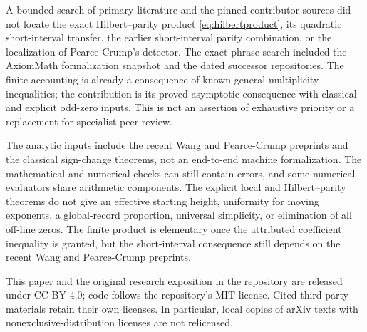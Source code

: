 \documentclass[11pt]{article}
\theoremstyle{remark}
\begin{document}
A bounded search of primary literature and the pinned contributor sources
did not locate the exact Hilbert--parity product \eqref{eq:hilbertproduct},
its quadratic short-interval transfer, the earlier short-interval parity
combination, or the localization of Pearce-Crump's detector. The exact-phrase
search included the AxiomMath formalization snapshot and the dated successor
repositories. The finite accounting is already a consequence
of known general multiplicity inequalities; the contribution is its proved
asymptotic consequence with classical and explicit odd-zero inputs. This is
not an assertion of exhaustive priority or a replacement for specialist peer
review.

The analytic inputs include the recent Wang and Pearce-Crump preprints and
the classical sign-change theorems, not an end-to-end machine formalization.
The mathematical and numerical checks can still contain errors, and some
numerical evaluators share arithmetic components. The explicit local and Hilbert--parity theorems
do not give an effective starting height, uniformity for moving exponents,
a global-record proportion, universal simplicity, or elimination of all
off-line zeros. The finite product is elementary once the attributed
coefficient inequality is granted, but the short-interval consequence still
depends on the recent Wang and Pearce-Crump preprints.

This paper and the original research exposition in the repository are
released under CC BY 4.0; code follows the repository's MIT license.
Cited third-party materials retain their own licenses. In particular,
local copies of arXiv texts with nonexclusive-distribution licenses are
not relicensed.
\end{document}
